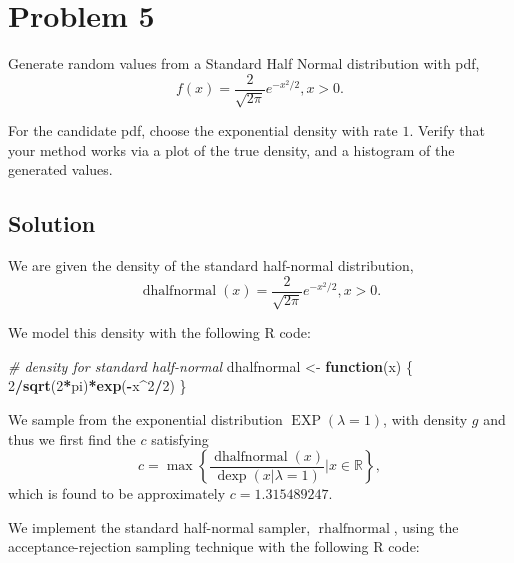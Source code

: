 \documentclass[
  10pt,
  twocolumn]{article}
\newenvironment{Shaded}{\begin{snugshade}}{\end{snugshade}}
\newcommand{\CommentTok}[1]{\textcolor[rgb]{0.56,0.35,0.01}{\textit{#1}}}
\newcommand{\ControlFlowTok}[1]{\textcolor[rgb]{0.13,0.29,0.53}{\textbf{#1}}}
\newcommand{\DecValTok}[1]{\textcolor[rgb]{0.00,0.00,0.81}{#1}}
\newcommand{\FunctionTok}[1]{\textcolor[rgb]{0.13,0.29,0.53}{\textbf{#1}}}
\newcommand{\NormalTok}[1]{#1}
\newcommand{\OtherTok}[1]{\textcolor[rgb]{0.56,0.35,0.01}{#1}}
\newcommand{\SpecialCharTok}[1]{\textcolor[rgb]{0.81,0.36,0.00}{\textbf{#1}}}
\begin{document}
\hypertarget{problem-5}{%
\section{Problem 5}\label{problem-5}}

Generate random values from a Standard Half Normal distribution with
pdf, \[
f(x) = \frac{2}{\sqrt{2 \pi}} e^{-x^2/2} , x > 0.
\]

For the candidate pdf, choose the exponential density with rate \(1\).
Verify that your method works via a plot of the true density, and a
histogram of the generated values.

\hypertarget{solution-2}{%
\subsection{Solution}\label{solution-2}}

We are given the density of the standard half-normal distribution, \[
  \operatorname{dhalfnormal}(x) = \frac{2}{\sqrt{2 \pi}} e^{-x^2/2}, x > 0.
\]

We model this density with the following R code:

\begin{Shaded}
\begin{Highlighting}[]
\CommentTok{\# density for standard half{-}normal}
\NormalTok{dhalfnormal }\OtherTok{\textless{}{-}} \ControlFlowTok{function}\NormalTok{(x) \{ }\DecValTok{2}\SpecialCharTok{/}\FunctionTok{sqrt}\NormalTok{(}\DecValTok{2}\SpecialCharTok{*}\NormalTok{pi)}\SpecialCharTok{*}\FunctionTok{exp}\NormalTok{(}\SpecialCharTok{{-}}\NormalTok{x}\SpecialCharTok{\^{}}\DecValTok{2}\SpecialCharTok{/}\DecValTok{2}\NormalTok{) \}}
\end{Highlighting}
\end{Shaded}

We sample from the exponential distribution
\(\operatorname{EXP}(\lambda=1)\), with density \(g\) and thus we first
find the \(c\) satisfying \[
  c = \max \left\{ \frac{\operatorname{dhalfnormal}(x)}{\operatorname{dexp}(x|\lambda=1)} | x \in \mathbb{R} \right\},
\] which is found to be approximately \(c = 1.315489247\).

We implement the standard half-normal sampler,
\(\operatorname{rhalfnormal}\), using the acceptance-rejection sampling
technique with the following R code:
\end{document}
